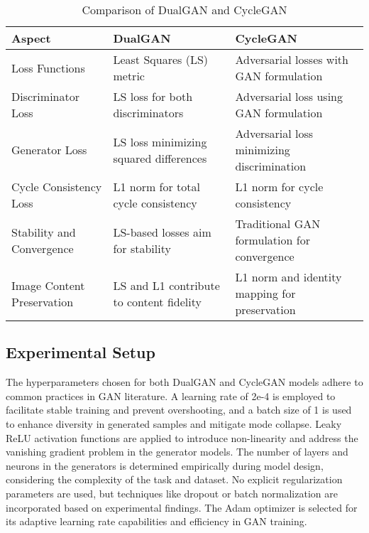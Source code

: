 \documentclass[conference]{IEEEtran}
\begin{document}
\begin{table}[ht]
\centering
\captionsetup{justification=centering}
\caption{Comparison of DualGAN and CycleGAN}
\begin{tabular}{|p{1.5cm} | p{3cm} | p{3cm}|}
\toprule
\hline
\textbf{Aspect} & \textbf{DualGAN} & \textbf{CycleGAN} \\
\hline
\midrule
Loss Functions & Least Squares (LS) metric & Adversarial losses with GAN formulation \\
Discriminator Loss & LS loss for both discriminators & Adversarial loss using GAN formulation \\
Generator Loss & LS loss minimizing squared differences & Adversarial loss minimizing discrimination \\
Cycle Consistency Loss & L1 norm for total cycle consistency & L1 norm for cycle consistency \\
Stability and Convergence & LS-based losses aim for stability & Traditional GAN formulation for convergence \\
Image Content Preservation & LS and L1 contribute to content fidelity & L1 norm and identity mapping for preservation \\
\hline
\bottomrule
\end{tabular}
\end{table}


\subsection{Experimental Setup}
The hyperparameters chosen for both DualGAN and CycleGAN models adhere to common practices in GAN literature. A learning rate of 2e-4 is employed to facilitate stable training and prevent overshooting, and a batch size of 1 is used to enhance diversity in generated samples and mitigate mode collapse. Leaky ReLU activation functions are applied to introduce non-linearity and address the vanishing gradient problem in the generator models. The number of layers and neurons in the generators is determined empirically during model design, considering the complexity of the task and dataset. No explicit regularization parameters are used, but techniques like dropout or batch normalization are incorporated based on experimental findings. The Adam optimizer is selected for its adaptive learning rate capabilities and efficiency in GAN training.
\end{document}
